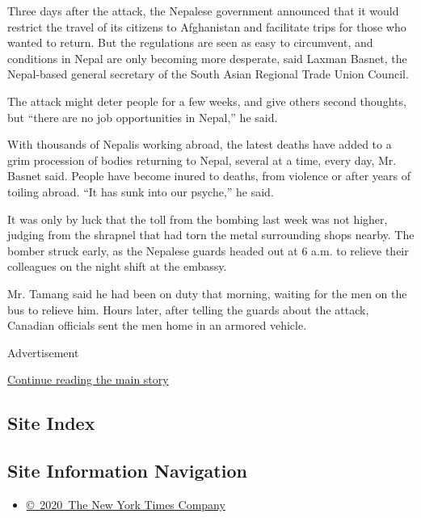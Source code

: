 Three days after the attack, the Nepalese government announced that it
would restrict the travel of its citizens to Afghanistan and facilitate
trips for those who wanted to return. But the regulations are seen as
easy to circumvent, and conditions in Nepal are only becoming more
desperate, said Laxman Basnet, the Nepal-based general secretary of the
South Asian Regional Trade Union Council.

The attack might deter people for a few weeks, and give others second
thoughts, but ``there are no job opportunities in Nepal,'' he said.

With thousands of Nepalis working abroad, the latest deaths have added
to a grim procession of bodies returning to Nepal, several at a time,
every day, Mr. Basnet said. People have become inured to deaths, from
violence or after years of toiling abroad. ``It has sunk into our
psyche,'' he said.

It was only by luck that the toll from the bombing last week was not
higher, judging from the shrapnel that had torn the metal surrounding
shops nearby. The bomber struck early, as the Nepalese guards headed out
at 6 a.m. to relieve their colleagues on the night shift at the embassy.

Mr. Tamang said he had been on duty that morning, waiting for the men on
the bus to relieve him. Hours later, after telling the guards about the
attack, Canadian officials sent the men home in an armored vehicle.

Advertisement

\protect\hyperlink{after-bottom}{Continue reading the main story}

\hypertarget{site-index}{%
\subsection{Site Index}\label{site-index}}

\hypertarget{site-information-navigation}{%
\subsection{Site Information
Navigation}\label{site-information-navigation}}

\begin{itemize}
\tightlist
\item
  \href{https://help.nytimes3xbfgragh.onion/hc/en-us/articles/115014792127-Copyright-notice}{©~2020~The
  New York Times Company}
\end{itemize}

